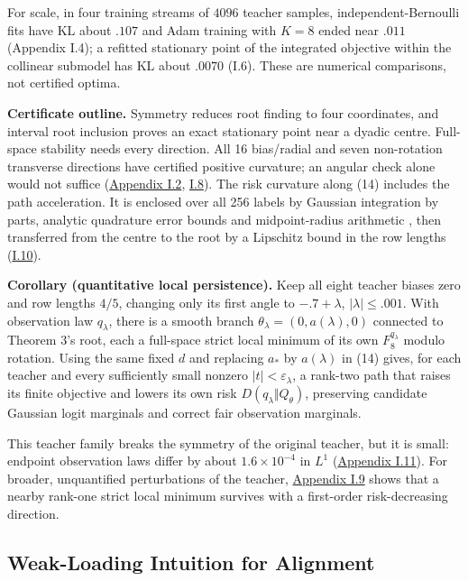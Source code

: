\documentclass{article}
\begin{document}
For scale, in four training streams of \(4096\) teacher samples,
independent-Bernoulli fits have KL about \(.107\) and Adam training with
\(K=8\) ended near \(.011\) (Appendix I.4); a refitted stationary point
of the integrated objective within the collinear submodel has KL about
\(.0070\) (I.6). These are numerical comparisons, not certified optima.

\textbf{Certificate outline.} Symmetry reduces root finding to four
coordinates, and interval root inclusion proves an exact stationary
point near a dyadic centre. Full-space stability needs every direction.
All 16 bias/radial and seven non-rotation transverse directions have
certified positive curvature; an angular check alone would not suffice
(\hyperref[full-hessian-criterion]{Appendix I.2},
\hyperref[full-local-statement]{I.8}). The risk curvature along (14)
includes the path acceleration. It is enclosed over all 256 labels by
Gaussian integration by parts, analytic quadrature error bounds
\citep{trefethen2014} and midpoint-radius arithmetic
\citep{johansson2017}, then transferred from the centre to the root by a
Lipschitz bound in the row lengths (\hyperref[same-root-angle]{I.10}).

\protect{}\label{quantitative-persistence-corollary}
\textbf{Corollary (quantitative local persistence).} Keep all eight
teacher biases zero and row lengths \(4/5\), changing only its first
angle to \(-.7+\lambda\), \(|\lambda|\le.001\). With observation law
\(q_\lambda\), there is a smooth branch
\(\theta_\lambda=(0,a(\lambda),0)\) connected to Theorem 3's root, each
a full-space strict local minimum of its own \(F_8^{q_\lambda}\) modulo
rotation. Using the same fixed \(d\) and replacing \(a_*\) by
\(a(\lambda)\) in (14) gives, for each teacher and every sufficiently
small nonzero \(|t|<\varepsilon_\lambda\), a rank-two path that raises
its finite objective and lowers its own risk
\(D(q_\lambda\Vert Q_\theta)\), preserving candidate Gaussian logit
marginals and correct fair observation marginals.

This teacher family breaks the symmetry of the original teacher, but it
is small: endpoint observation laws differ by about \(1.6\times10^{-4}\)
in \(L^1\) (\hyperref[teacher-family-full-statement]{Appendix I.11}).
For broader, unquantified perturbations of the teacher,
\hyperref[local-persistence]{Appendix I.9} shows that a nearby rank-one
strict local minimum survives with a first-order risk-decreasing
direction.

\subsection{Weak-Loading Intuition for
Alignment}\label{weak-loading-intuition-for-alignment}
\end{document}
